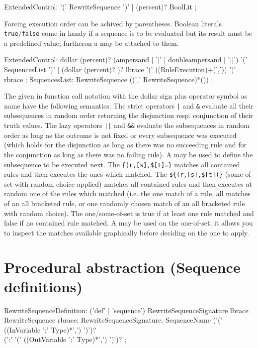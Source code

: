 \begin{rail} 
  ExtendedControl: 
    '(' RewriteSequence ')' |
    (percent)? BoolLit
	;
\end{rail}

Forcing execution order can be achived by parentheses.
Boolean literals \texttt{true}/\texttt{false} come in handy if a sequence is to be evaluated 
but its result must be a predefined value; furtheron a  may be attached to them.

\begin{rail} 
  ExtendedControl: 
	dollar (percent)? (ampersand | '|' | doubleampersand | '||') '(' SequencesList ')' |
	(dollar (percent)? )? lbrace '(' ((RuleExecution)+(',')) ')' rbrace
	;
  SequencesList:
	RewriteSequence ((',' RewriteSequence)*())
	;
\end{rail}

The  given in function call notation with the dollar sign plus operator symbol as name have the following semantics:
The strict operators \verb/|/ and \verb/&/ evaluate all their subsequences in random order returning the disjunction resp. conjunction of their truth values.
The lazy operators \verb/||/ and \verb/&&/ evaluate the subsequences in random order as long as the outcome is not fixed or every subsequence was executed 
(which holds for the disjunction as long as there was no succeeding rule and for the conjunction as long as there was no failing rule).
A  may be used to define the subsequence to be executed next.
The  \verb/{(r,[s],$[t]=}/ matches all contained rules and then executes the ones which matched.
The  \verb/${(r,[s],$[t])}/ (some-of-set with random choice applied) matches all contained rules and then executes at random one of the rules which matched
(i.e. the one match of a rule, all matches of an all bracketed rule, or one randomly chosen match of an all bracketed rule with random choice).
The one/some-of-set is true if at least one rule matched and false if no contained rule matched.
A  may be used on the one-of-set; it allows you to inspect the matches available graphically before deciding on the one to apply. 


\section{Procedural abstraction (Sequence definitions)} \label{sec:sequencedefinition}
\begin{rail}
  RewriteSequenceDefinition: 
    ('def' | 'sequence') RewriteSequenceSignature lbrace RewriteSequence rbrace;
  RewriteSequenceSignature: 
    SequenceName ('(' ((InVariable ':' Type)*',') ')')? \\ (':' '(' ((OutVariable ':' Type)*',') ')')?
	;
\end{rail}

